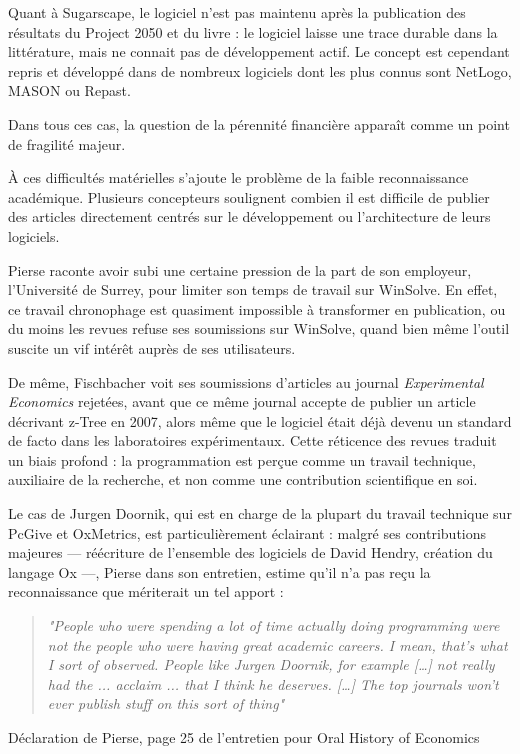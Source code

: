 Quant à Sugarscape, le logiciel n'est pas maintenu après la publication des résultats du Project 2050 et du livre \cite{epsteinGrowingArtificialSocieties1996} : le logiciel laisse une trace durable dans la littérature, mais ne connait pas de développement actif. Le concept est cependant repris et développé dans de nombreux logiciels dont les plus connus sont NetLogo, MASON ou Repast.

Dans tous ces cas, la question de la pérennité financière apparaît comme un point de fragilité majeur.

À ces difficultés matérielles s’ajoute le problème de la faible reconnaissance académique. Plusieurs concepteurs soulignent combien il est difficile de publier des articles directement centrés sur le développement ou l’architecture de leurs logiciels. 

Pierse raconte avoir subi une certaine pression de la part de son employeur, l'Université de Surrey, pour limiter son temps de travail sur WinSolve. En effet, ce travail chronophage est quasiment impossible à transformer en publication, ou du moins les revues refuse ses soumissions sur WinSolve, quand bien même l’outil suscite un vif intérêt auprès de ses utilisateurs. 

De même, Fischbacher voit ses soumissions d'articles au journal \textit{Experimental Economics} rejetées, avant que ce même journal accepte de publier un article décrivant z-Tree en 2007, alors même que le logiciel était déjà devenu un standard de facto dans les laboratoires expérimentaux. Cette réticence des revues traduit un biais profond : la programmation est perçue comme un travail technique, auxiliaire de la recherche, et non comme une contribution scientifique en soi.

Le cas de Jurgen Doornik, qui est en charge de la plupart du travail technique sur PcGive et OxMetrics, est particulièrement éclairant : malgré ses contributions majeures — réécriture de l’ensemble des logiciels de David Hendry, création du langage Ox —, Pierse dans son entretien, estime qu'il n'a pas reçu la reconnaissance que mériterait un tel apport :

\begin{quote}
\begin{center}
\textit{"People who were spending a lot of time actually doing programming were not the people who were having great academic careers. I mean, that’s what I sort of observed. People like Jurgen Doornik, for example […] not really had the ... acclaim ... that I think he deserves. […] The top journals won’t ever publish stuff on this sort of thing"}
\end{center}
\end{quote} \hfill Déclaration de Pierse, page 25 de l'entretien pour Oral History of Economics \cite{pierseInterviewRichardPierse2024}



